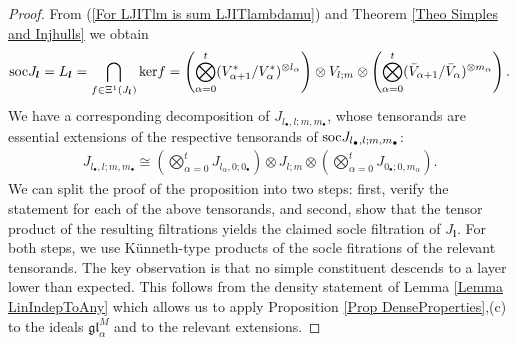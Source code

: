 \documentclass[12pt]{article}
\def\mk {\mathfrak}
\begin{document}
\begin{proof}
From (\ref{For LJITlm is sum LJITlambdamu}) and Theorem \ref{Theo Simples and Injhulls} we obtain
$$
{\rm soc}J_{\bm l} = L_{\bm l} = \bigcap\limits_{f\in\Xi^{1}(J_{\bm l})} {\rm ker}f = \left(\bigotimes\limits_{\alpha=0}^t (V^*_{\alpha+1}/V^*_\alpha)^{\otimes l_\alpha} \right) \otimes V_{l;m} \otimes \left( \bigotimes\limits_{\alpha=0}^t (\bar V_{\alpha+1}/\bar V_\alpha)^{\otimes m_\alpha} \right).
$$
We have a corresponding decomposition of $J_{l_\bullet,l;m,m_\bullet}$, whose tensorands are essential extensions of the respective tensorands of ${\rm soc}J_{l_\bullet,l;m,m_\bullet}$:
\begin{gather}\label{For Jlm is a product of pures}
J_{l_\bullet,l;m,m_\bullet} \cong \left(\bigotimes\limits_{\alpha=0}^t J_{l_\alpha,0;0_\bullet} \right) \otimes J_{l;m} \otimes \left( \bigotimes\limits_{\alpha=0}^t J_{0_\bullet;0,m_\alpha} \right).
\end{gather}
We can split the proof of the proposition into two steps: first, verify the statement for each of the above tensorands, and second, show that the tensor product of the resulting filtrations yields the claimed socle filtration of $J_{\bm l}$. For both steps, we use K\"unneth-type products of the socle fitrations of the relevant tensorands. The key observation is that no simple constituent descends to a layer lower than expected. This follows from the density statement of Lemma \ref{Lemma LinIndepToAny} which allows us to apply Proposition \ref{Prop DenseProperties},(c) to the ideals $\mk{gl}^M_\alpha$ and to the relevant extensions.


\end{proof}
\end{document}
